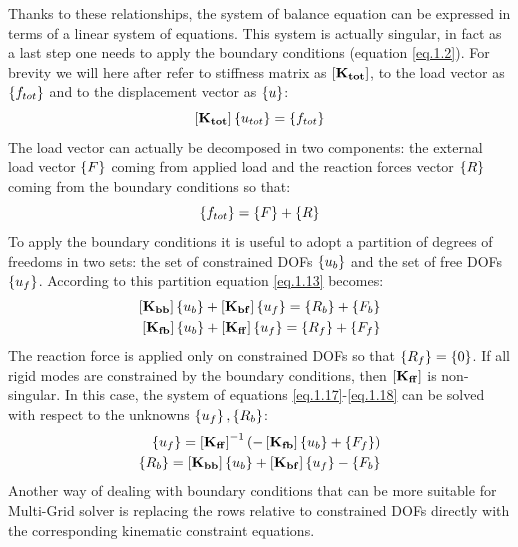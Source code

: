 Thanks to these relationships, the system of balance equation can be expressed in terms of a linear system of equations. This system is actually singular, in fact as a last step one needs to apply the boundary conditions (equation \eqref{eq.1.2}). For brevity we will here after refer to stiffness matrix as $\left[{\mathbf{K_{tot}}}\right]$, to the load vector as $\left\lbrace{f_{tot}}\right \rbrace$ and to the displacement vector as  $\left\lbrace{u}\right \rbrace$:
\begin{equation}
\label{eq.1.32}
\left[{\mathbf{K_{tot}}}\right]\left\lbrace{u_{tot}}\right \rbrace=\left\lbrace{f_{tot}}\right \rbrace
\end{equation} The load vector can actually be decomposed in two components: the external load vector $\left\lbrace{F}\right \rbrace$ coming from applied load and the reaction forces vector $\left\lbrace{R}\right \rbrace$ coming from the boundary conditions so that:
\begin{equation}
\left\lbrace{f_{tot}}\right \rbrace=\left\lbrace{F}\right \rbrace+\left\lbrace{R}\right \rbrace
\end{equation}
To apply the boundary conditions it is useful to adopt a partition of degrees of freedoms in two sets:
the set of constrained DOFs $\left\lbrace{u_b}\right \rbrace$ and the set of free DOFs $\left\lbrace{u_f}\right \rbrace$. According to this partition equation \eqref{eq.1.13} becomes:
\begin{eqnarray}
\label{eq.1.17}
\left[{\mathbf{K_{bb}}}\right]\left\lbrace{u_b}\right \rbrace+\left[{\mathbf{K_{bf}}}\right]\left\lbrace{u_f}\right \rbrace=\left\lbrace{R_b}\right \rbrace+\left\lbrace{F_b}\right \rbrace\\
\label{eq.1.18}
\left[{\mathbf{K_{fb}}}\right]\left\lbrace{u_b}\right \rbrace+\left[{\mathbf{K_{ff}}}\right]\left\lbrace{u_f}\right \rbrace=\left\lbrace{R_f}\right \rbrace+\left\lbrace{F_f}\right \rbrace
\end{eqnarray}
The reaction force is applied only on constrained DOFs so that $\left\lbrace{R_f}\right \rbrace=\left\lbrace{0}\right \rbrace$. If all rigid modes are constrained by the boundary conditions, then $\left[{\mathbf{K_{ff}}}\right]$ is non-singular.
 In this case, the system of equations \eqref{eq.1.17}-\eqref{eq.1.18} can be solved with respect to the unknowns $\left\lbrace{u_f}\right \rbrace,\left\lbrace{R_b}\right \rbrace$:
\begin{eqnarray}
\label{eq.1.19}
\left\lbrace{u_f}\right \rbrace=\left[{\mathbf{K_{ff}}}\right]^{-1}\left(-\left[{\mathbf{K_{fb}}}\right]\left\lbrace{u_b}\right \rbrace+\left\lbrace{F_f}\right \rbrace\right)\\
\label{eq.1.20}
\left\lbrace{R_b}\right \rbrace=\left[{\mathbf{K_{bb}}}\right]\left\lbrace{u_b}\right \rbrace+\left[{\mathbf{K_{bf}}}\right]\left\lbrace{u_f}\right \rbrace-\left\lbrace{F_b}\right \rbrace
\end{eqnarray}
Another way of dealing with boundary conditions that can be more suitable for Multi-Grid solver is replacing the rows relative to constrained DOFs directly with the corresponding kinematic constraint equations.
